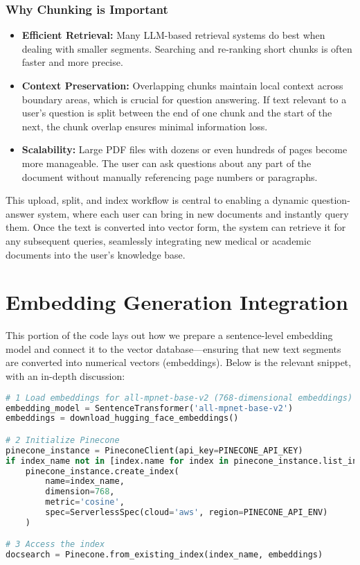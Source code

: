 \subsubsection*{Why Chunking is Important}
\begin{itemize}
  \item \textbf{Efficient Retrieval:} Many LLM-based retrieval systems do best when dealing with smaller segments. Searching and re-ranking short chunks is often faster and more precise.
  \item \textbf{Context Preservation:} Overlapping chunks maintain local context across boundary areas, which is crucial for question answering. If text relevant to a user’s question is split between the end of one chunk and the start of the next, the chunk overlap ensures minimal information loss.
  \item \textbf{Scalability:} Large PDF files with dozens or even hundreds of pages become more manageable. The user can ask questions about any part of the document without manually referencing page numbers or paragraphs.
\end{itemize}

This upload, split, and index workflow is central to enabling a dynamic question-answer system, where each user can bring in new documents and instantly query them. Once the text is converted into vector form, the system can retrieve it for any subsequent queries, seamlessly integrating new medical or academic documents into the user’s knowledge base.

\section{Embedding Generation Integration}
\label{sec:embedding-generation}

This portion of the code lays out how we prepare a sentence-level embedding model and connect it to the vector database—ensuring that new text segments are converted into numerical vectors (embeddings). Below is the relevant snippet, with an in-depth discussion:

\begin{lstlisting}[language=Python, caption={Embedding Model Setup and Pinecone Integration}, basicstyle=\small\ttfamily]
# 1 Load embeddings for all-mpnet-base-v2 (768-dimensional embeddings)
embedding_model = SentenceTransformer('all-mpnet-base-v2')
embeddings = download_hugging_face_embeddings()

# 2 Initialize Pinecone
pinecone_instance = PineconeClient(api_key=PINECONE_API_KEY)
if index_name not in [index.name for index in pinecone_instance.list_indexes()]:
    pinecone_instance.create_index(
        name=index_name,
        dimension=768,
        metric='cosine',
        spec=ServerlessSpec(cloud='aws', region=PINECONE_API_ENV)
    )

# 3 Access the index
docsearch = Pinecone.from_existing_index(index_name, embeddings)
\end{lstlisting}

